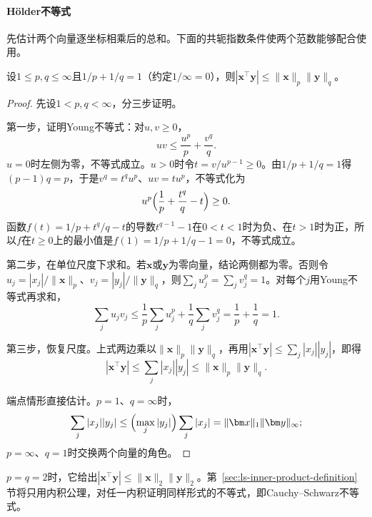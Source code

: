 \paragraph{Hölder不等式}
先估计两个向量逐坐标相乘后的总和。下面的共轭指数条件使两个范数能够配合使用。
\begin{theorem}[有限维Hölder不等式]
\label{thm:linear-algebra-holder}
设$1\leq p,q\leq\infty$且$1/p+1/q=1$（约定$1/\infty=0$），则$|\bm x^\top\bm y|\leq\lVert\bm x\rVert_p\lVert\bm y\rVert_q$。
\end{theorem}
\begin{proof}
先设$1<p,q<\infty$，分三步证明。

第一步，证明Young不等式：对$u,v\geq0$，
\[
 uv\leq\frac{u^p}{p}+\frac{v^q}{q}.
\]
$u=0$时左侧为零，不等式成立。$u>0$时令$t=v/u^{p-1}\geq0$。由$1/p+1/q=1$得$(p-1)q=p$，于是$v^q=t^qu^p$、$uv=tu^p$，不等式化为
\[
 u^p\Bigl(\frac1p+\frac{t^q}{q}-t\Bigr)\geq0.
\]
函数$f(t)=1/p+t^q/q-t$的导数$t^{q-1}-1$在$0<t<1$时为负、在$t>1$时为正，所以$f$在$t\geq0$上的最小值是$f(1)=1/p+1/q-1=0$，不等式成立。

第二步，在单位尺度下求和。若$\bm x$或$\bm y$为零向量，结论两侧都为零。否则令$u_j=|x_j|/\lVert\bm x\rVert_p$、$v_j=|y_j|/\lVert\bm y\rVert_q$，则$\sum_ju_j^p=\sum_jv_j^q=1$。对每个$j$用Young不等式再求和，
\[
 \sum_ju_jv_j\leq\frac1p\sum_ju_j^p+\frac1q\sum_jv_j^q=\frac1p+\frac1q=1.
\]

第三步，恢复尺度。上式两边乘以$\lVert\bm x\rVert_p\lVert\bm y\rVert_q$，再用$|\bm x^\top\bm y|\leq\sum_j|x_j||y_j|$，即得
\[
 |\bm x^\top\bm y|\leq\sum_j|x_j||y_j|\leq\lVert\bm x\rVert_p\lVert\bm y\rVert_q.
\]

端点情形直接估计。$p=1$、$q=\infty$时，
\[
 \sum_j|x_j||y_j|\leq\Bigl(\max_j|y_j|\Bigr)\sum_j|x_j|=\lVert\bm x\rVert_1\lVert\bm y\rVert_\infty;
\]
$p=\infty$、$q=1$时交换两个向量的角色。
\end{proof}
$p=q=2$时，它给出$|\bm x^\top\bm y|\leq\lVert\bm x\rVert_2\lVert\bm y\rVert_2$。第~\ref{sec:ls-inner-product-definition}节将只用内积公理，对任一内积证明同样形式的不等式，即Cauchy--Schwarz不等式。

